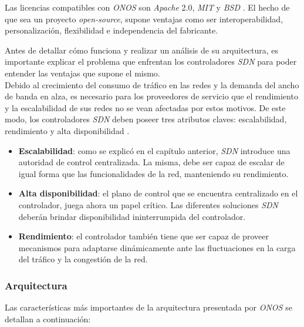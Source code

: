 Las licencias compatibles con \textit{ONOS} son \textit{Apache} 2.0, \textit{MIT} y \textit{BSD} \parencite{onfflic}. El hecho de que sea un proyecto \textit{open-source}, supone ventajas como ser interoperabilidad, personalización, flexibilidad e independencia del fabricante. 

Antes de detallar cómo funciona y realizar un análisis de su arquitectura, es importante explicar el problema que enfrentan los controladores \textit{SDN} para poder entender las ventajas que supone el mismo. 
\\

Debido al crecimiento del consumo de tráfico en las redes y la demanda del ancho de banda en alza, es necesario para los proveedores de servicio que el rendimiento y la escalabilidad de sus redes no se vean afectadas por estos motivos. De este modo, los controladores \textit{SDN} deben poseer tres atributos claves: escalabilidad, rendimiento y alta disponibilidad \parencite{sdnproblema}.

\begin{itemize}
	\item \textbf{Escalabilidad}: como se explicó en el capítulo anterior, \textit{SDN} introduce una autoridad de control centralizada. La misma, debe ser capaz de escalar de igual forma que las funcionalidades de la red, manteniendo su rendimiento.
	\item \textbf{Alta disponibilidad}: el plano de control que se encuentra centralizado en el controlador, juega ahora un papel crítico. Las diferentes soluciones \textit{SDN} deberán brindar disponibilidad ininterrumpida del controlador.
	\item \textbf{Rendimiento}: el controlador también tiene que ser capaz de proveer mecanismos para adaptarse dinámicamente ante las fluctuaciones en la carga del tráfico y la congestión de la red. 
\end{itemize}

\subsubsection{Arquitectura}
Las características más importantes de la arquitectura presentada por \textit{ONOS} \parencite{onffwhite} se detallan a continuación:


